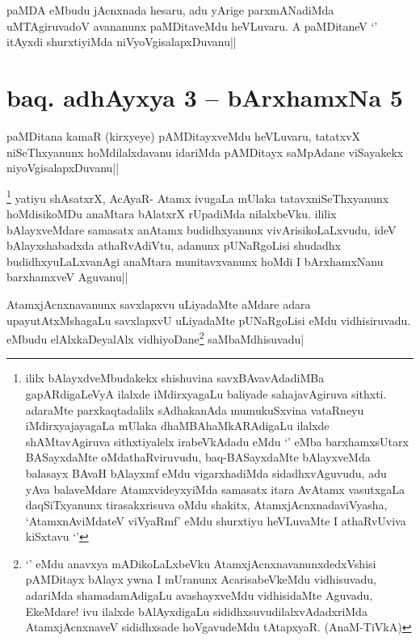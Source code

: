 
\begin{artha}
paMDA eMbudu jAcnxnada hesaru, adu yArige parxmANadiMda uMTAgiruvadoV avananunx paMDitaveMdu heVLuvaru. A paMDitaneV `\stext ' itAyxdi shurxtiyiMda niVyoVgisalapxDuvanu||
\end{artha}

\section*{baq. adhAyxya 3 -- bArxhamxNa 5}

paMDitana kamaR (kirxyeye) pAMDitayxveMdu heVLuvaru, tatatxvX niSeThxyanunx hoMdilalxdavanu idariMda pAMDitayx saMpAdane viSayakekx niyoVgisalapxDuvanu||


\begin{artha}
\footnote[1]{ililx bAlayxdveMbudakekx shishuvina savxBAvavAdadiMBa gapARdigaLeVyA ilalxde iMdirxyagaLu baliyade sahajavAgiruva sithxti. adaraMte parxkaqtadalilx sAdhakanAda mumukuSxvina vataRneyu iMdirxyajayagaLa mUlaka dhaMBAhaMkARAdigaLu ilalxde shAMtavAgiruva sithxtiyalelx irabeVkAdadu eMdu `\stext ' eMba barxhamxsUtarx BASayxdaMte oMdathaRviruvudu, baq-BASayxdaMte bAlayxveMda balasayx BAvaH bAlayxmf eMdu vigarxhadiMda sidadhxvAguvudu, adu yAva balaveMdare AtamxvideyxyiMda samasatx itara AvAtamx vasutxgaLa daqSiTxyanunx  tirasakxrisuva oMdu shakitx, AtamxjAcnxnadaviVyasha, `AtamxnAviMdateV viVyaRmf' eMdu shurxtiyu heVLuvaMte I athaRvUviva kiSxtavu `\stext '} yatiyu shAsatxrX, AcAyaR- Atamx ivugaLa mUlaka tatavxniSeThxyanunx hoMdisikoMDu anaMtara bAlatxrX rUpadiMda nilalxbeVku. ililix bAlayxveMdare samasatx anAtamx budidhxyanunx vivArisikoLaLxvudu, ideV bAlayxshabadxda athaRvAdiVtu, adanunx pUNaRgoLisi shudadhx budidhxyuLaLxvanAgi anaMtara munitavxvanunx hoMdi I bArxhamxNanu barxhamxveV Aguvanu||
\end{artha}

\begin{artha}
AtamxjAcnxnavanunx savxlapxvu uLiyadaMte aMdare adara upayutAtxMshagaLu savxlapxvU uLiyadaMte pUNaRgoLisi \stext eMdu vidhisiruvadu. \stext  eMbudu elAlxkaDeyalAlx vidhiyoDane\footnote[2]{`\stext ' eMdu anavxya mADikoLaLxbeVku AtamxjAcnxnavanunxdedxVshisi pAMDitayx bAlayx ywna I mUranunx AcarisabeVkeMdu vidhisuvadu, adariMda shamadamAdigaLu avashayxveMdu vidhisidaMte Aguvadu, EkeMdare! ivu ilalxde bAlAyxdigaLu sididhxsuvudilalxvAdadxriMda AtamxjAcnxnaveV sididhxsade hoVgavudeMdu tAtapxyaR. (AnaM-TiVkA)} saMbaMdhisuvadu|
\end{artha}

